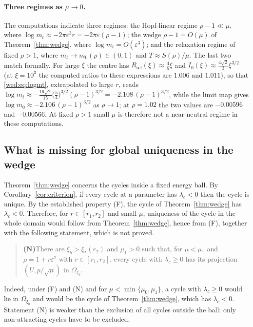 \paragraph{Three regimes as $\mu\to0$.}
The computations indicate three regimes: the Hopf-linear regime $\rho-1\ll\mu$, where $\log m_t\approx-2\pi\varepsilon^3r=-2\pi\varepsilon(\rho-1)$; the wedge $\rho-1=O(\mu)$ of Theorem~\ref{thm:wedge}, where $\log m_t=O(\varepsilon^3)$; and the relaxation regime of fixed $\rho>1$, where $m_t\to m_0(\rho)\in(0,1)$ and $T\approx S(\rho)/\mu$. The last two match formally. For large $\xi$ the centre has $R_{\mathrm{sel}}(\xi)\approx\tfrac45\xi$ and $I_0(\xi)\approx\tfrac{4\sqrt2}{3}\xi^{3/2}$ (at $\xi=10^3$ the computed ratios to these expressions are $1.006$ and $1.011$), so that \eqref{wed:eq:logmt}, extrapolated to large $r$, reads $\log m_t\approx-\tfrac{16\sqrt2}{15}\bigl(\tfrac54\bigr)^{3/2}(\rho-1)^{3/2}=-2.108\,(\rho-1)^{3/2}$, while the limit map gives $\log m_0\approx-2.106\,(\rho-1)^{3/2}$ as $\rho\to1$; at $\rho=1.02$ the two values are $-0.00596$ and $-0.00566$. At fixed $\rho>1$ small $\mu$ is therefore not a near-neutral regime in these computations.

\subsection{What is missing for global uniqueness in the wedge}\label{wed:sec:missing}
Theorem~\ref{thm:wedge} concerns the cycles inside a fixed energy ball. By Corollary~\ref{cor:criterion}, if every cycle at a parameter has $\lambda_c<0$ then the cycle is unique. By the established property \textup{(F)}, the cycle of Theorem~\ref{thm:wedge} has $\lambda_c<0$. Therefore, for $r\in[r_1,r_2]$ and small $\mu$, uniqueness of the cycle in the whole domain would follow from Theorem~\ref{thm:wedge}, hence from \textup{(F)}, together with the following statement, which is not proved.
\begin{quote}
\textbf{(N)}\quad There are $\xi_b>\xi_*(r_2)$ and $\mu_1>0$ such that, for $\mu<\mu_1$ and $\rho=1+r\varepsilon^2$ with $r\in[r_1,r_2]$, every cycle with $\lambda_c\ge0$ has its projection $(U,p/\sqrt\mu)$ in $\Omega_{\xi_b}$.
\end{quote}
Indeed, under \textup{(F)} and \textup{(N)} and for $\mu<\min\{\mu_0,\mu_1\}$, a cycle with $\lambda_c\ge0$ would lie in $\Omega_{\xi_b}$ and would be the cycle of Theorem~\ref{thm:wedge}, which has $\lambda_c<0$. Statement \textup{(N)} is weaker than the exclusion of all cycles outside the ball: only non-attracting cycles have to be excluded.

